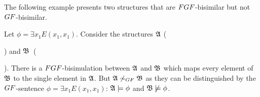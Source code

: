 The following example presents two structures that are $\FGF$-bisimilar but not $\GF$-bisimilar.
\begin{example} Let $\phi = \exists{x_{1}} E(x_{1}, x_{1})$. Consider the structures
  ${\mathfrak{A}}$ () and
  ${\mathfrak{B}}$~().
  There is a $\FGF$-bisimulation between ${\mathfrak{A}}$ and ${\mathfrak{B}}$ which maps every element of ${\mathfrak{B}}$ to the single element in ${\mathfrak{A}}$.
  But $\str{A} \not\bisimto_{\GF} \str{B}$ as they can be distinguished by the $\GF$-sentence $\phi = \exists{x_{1}} E(x_{1}, x_{1})$: ${\mathfrak{A}} \models \phi$ and ${\mathfrak{B}} \not\models \phi$.
\end{example}
